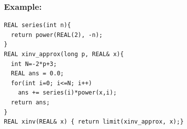 \begin{frame}[<+->][fragile]
\frametitle{Example: \irram}
\begin{example}
\begin{lstlisting}
REAL series(int n){
  return power(REAL(2), -n);
}
REAL xinv_approx(long p, REAL& x){
  int N=-2*p+3;
  REAL ans = 0.0;
  for(int i=0; i<=N; i++)
    ans += series(i)*power(x,i);
  return ans;
}
REAL xinv(REAL& x) { return limit(xinv_approx, x);}
\end{lstlisting}
\end{example}
\end{frame}
